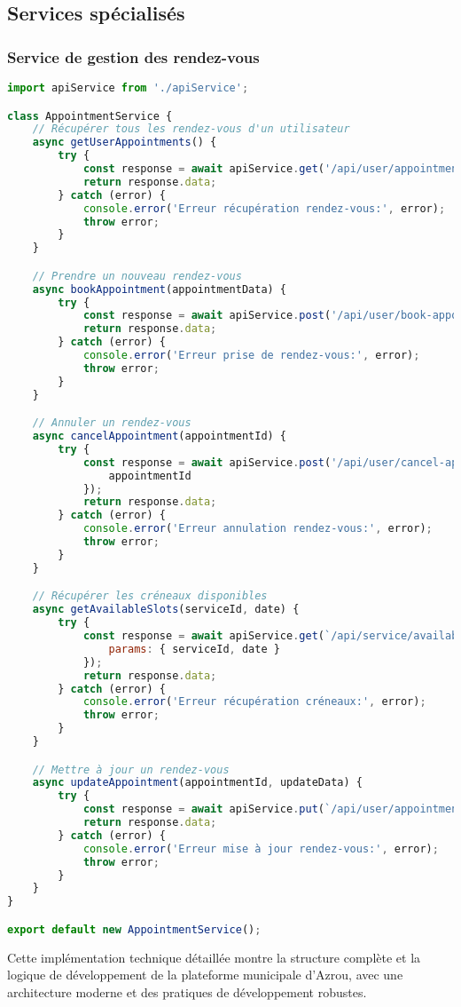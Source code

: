 \subsection{Services spécialisés}

\subsubsection{Service de gestion des rendez-vous}

\begin{lstlisting}[language=JavaScript, caption=appointmentService.js]
import apiService from './apiService';

class AppointmentService {
    // Récupérer tous les rendez-vous d'un utilisateur
    async getUserAppointments() {
        try {
            const response = await apiService.get('/api/user/appointments');
            return response.data;
        } catch (error) {
            console.error('Erreur récupération rendez-vous:', error);
            throw error;
        }
    }

    // Prendre un nouveau rendez-vous
    async bookAppointment(appointmentData) {
        try {
            const response = await apiService.post('/api/user/book-appointment', appointmentData);
            return response.data;
        } catch (error) {
            console.error('Erreur prise de rendez-vous:', error);
            throw error;
        }
    }

    // Annuler un rendez-vous
    async cancelAppointment(appointmentId) {
        try {
            const response = await apiService.post('/api/user/cancel-appointment', {
                appointmentId
            });
            return response.data;
        } catch (error) {
            console.error('Erreur annulation rendez-vous:', error);
            throw error;
        }
    }

    // Récupérer les créneaux disponibles
    async getAvailableSlots(serviceId, date) {
        try {
            const response = await apiService.get(`/api/service/available-slots`, {
                params: { serviceId, date }
            });
            return response.data;
        } catch (error) {
            console.error('Erreur récupération créneaux:', error);
            throw error;
        }
    }

    // Mettre à jour un rendez-vous
    async updateAppointment(appointmentId, updateData) {
        try {
            const response = await apiService.put(`/api/user/appointment/${appointmentId}`, updateData);
            return response.data;
        } catch (error) {
            console.error('Erreur mise à jour rendez-vous:', error);
            throw error;
        }
    }
}

export default new AppointmentService();
\end{lstlisting}

Cette implémentation technique détaillée montre la structure complète et la logique de développement de la plateforme municipale d'Azrou, avec une architecture moderne et des pratiques de développement robustes.
